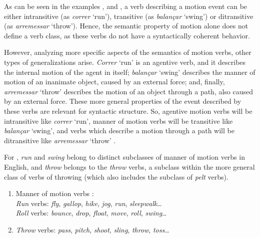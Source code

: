 \documentclass[english]{textolivre}
\begin{document}
As can be seen in the examples ,  and , a verb describing a motion event can be either intransitive (as \textit{correr} ‘run’), transitive (as \textit{balançar} ‘swing’) or ditransitive (as \textit{arremessar} ‘throw’). Hence, the semantic property of motion alone does not define a verb class, as these verbs do not have a syntactically coherent behavior.

However, analyzing more specific aspects of the semantics of motion verbs, other types of generalizations arise. \textit{Correr} ‘run’ is an agentive verb, and it describes the internal motion of the agent in itself; \textit{balançar} ‘swing’ describes the manner of motion of an inanimate object, caused by an external force; and, finally, \textit{arremessar} ‘throw’ describes the motion of an object through a path, also caused by an external force. These more general properties of the event described by these verbs are relevant for syntactic structure. So, agentive motion verbs will be intransitive like \textit{correr} ‘run’, manner of motion verbs will be transitive like \textit{balançar} ‘swing’, and verbs which describe a motion through a path will be ditransitive like \textit{arremessar} ‘throw’ \cite{levin_argument_2005,levin_english_1993,meirelles_propriedade_2017}.

For \textcite{levin_english_1993}, \textit{run} and \textit{swing} belong to distinct subclasses of manner of motion verbs in English, and \textit{throw} belongs to the \textit{throw} verbs, a subclass within the more general class of verbs of throwing (which also includes the subclass of \textit{pelt} verbs).

\begin{enumerate}[label=(\arabic*),resume]
\item \label{itm10} Manner of motion verbs \cite[p.~264]{levin_english_1993}: \\
\textit{Run} verbs: \textit{fly}, \textit{gallop}, \textit{hike}, \textit{jog}, \textit{run}, \textit{sleepwalk}… \\
\textit{Roll} verbs: \textit{bounce}, \textit{drop}, \textit{float}, \textit{move}, \textit{roll}, \textit{swing}…
\item \label{itm11}\textit{Throw} verbs: \textit{pass}, \textit{pitch}, \textit{shoot}, \textit{sling}, \textit{throw}, \textit{toss}…
 \cite[p.~146]{levin_english_1993}   
\end{enumerate}
   
\end{document}
